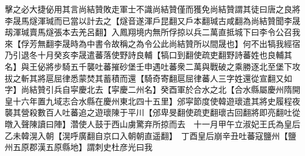 擊之必大捷佖用其言尚結贊敗走軍士不識尚結贊僅而獲免尚結贊謂其徒曰唐之良將李晟馬燧渾瑊而已當以計去之【燧音遂渾戶昆翻又戶本翻瑊古咸翻為尚結贊聞李晟刼渾瑊賣馬燧張本去羌呂翻】入鳳翔境内無所俘掠以兵二萬直抵城下曰李令公召我來【俘芳無翻李晟時為中書令故稱之為令公此尚結贊所以間晟也】何不出犒我經宿乃引退冬十月癸亥李晟遣蕃落使野詩良輔【犒口到翻使疏吏翻野詩蕃姓也良輔其名】與王佖將步騎五千襲吐蕃摧砂堡壬申遇吐蕃衆二萬與戰破之乘勝逐北至堡下攻拔之斬其將扈屈律悉蒙焚其蓄積而還【騎奇寄翻扈屈律蕃人三字姓還從宣翻又如字】尚結贊引兵自寜慶北去【寜慶二州名】癸酉軍於合水之北【合水縣屬慶州隋開皇十六年置九域志合水縣在慶州東北四十五里】邠寜節度使韓遊瓌遣其將史履程夜襲其營殺數百人吐蕃追之遊瓌陳于平川【邠卑旻翻使疏吏翻瓌古回翻將即亮翻吐從暾入聲陳讀曰陣】濳使人鼓于西山虜驚弃所掠而去　十一月甲午立淑妃王氏為皇后　乙未韓滉入朝【滉呼廣翻自京口入朝朝直遥翻】　丁酉皇后崩辛丑吐蕃寇鹽州【鹽州五原郡漢五原縣地】謂刺史杜彦光曰我

